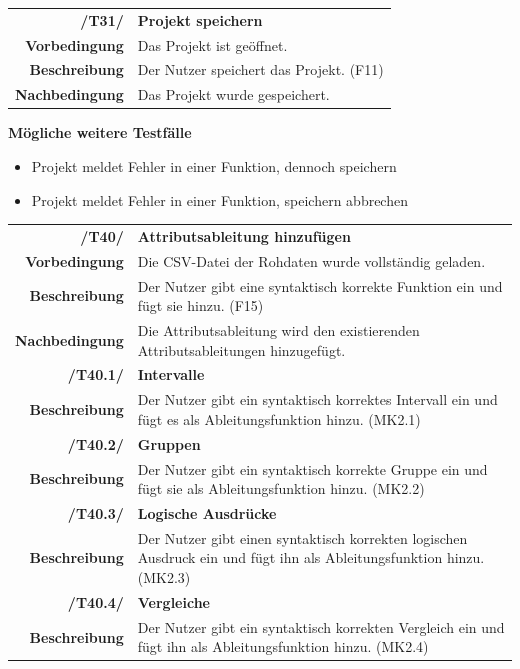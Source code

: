 \documentclass{article}
\begin{document}
\begin{table}[H]
\begin{tabularx}{\textwidth}{rX}
\textbf{/T31/}         & \textbf{Projekt speichern} \\
\textbf{Vorbedingung}  & Das Projekt ist geöffnet.   \\
\textbf{Beschreibung}  & Der Nutzer speichert das Projekt. (F11) \\
\textbf{Nachbedingung} & Das Projekt wurde gespeichert.
\end{tabularx}
\end{table}
\textbf{Mögliche weitere Testfälle}
\begin{itemize}
    \item Projekt meldet Fehler in einer Funktion, dennoch speichern
    \item Projekt meldet Fehler in einer Funktion, speichern abbrechen
\end{itemize}

\begin{table}[H]
\begin{tabularx}{\textwidth}{rX}
\textbf{/T40/}         & \textbf{Attributsableitung hinzufügen} \\
\textbf{Vorbedingung}  & Die CSV-Datei der Rohdaten wurde vollständig geladen.   \\
\textbf{Beschreibung}  & Der Nutzer gibt eine syntaktisch korrekte Funktion ein und fügt sie hinzu. (F15) \\
\textbf{Nachbedingung} & Die Attributsableitung wird den existierenden Attributsableitungen hinzugefügt.\\

\textbf{/T40.1/}         & \textbf{Intervalle} \\
\textbf{Beschreibung}  & Der Nutzer gibt ein syntaktisch korrektes Intervall ein und fügt es als Ableitungsfunktion hinzu. (MK2.1) \\

\textbf{/T40.2/}         & \textbf{Gruppen} \\
\textbf{Beschreibung}  & Der Nutzer gibt ein syntaktisch korrekte Gruppe ein und fügt sie als Ableitungsfunktion hinzu. (MK2.2) \\

\textbf{/T40.3/}         & \textbf{Logische Ausdrücke} \\
\textbf{Beschreibung}  & Der Nutzer gibt einen syntaktisch korrekten logischen Ausdruck ein und fügt ihn als Ableitungsfunktion hinzu. (MK2.3) \\

\textbf{/T40.4/}         & \textbf{Vergleiche} \\
\textbf{Beschreibung}  & Der Nutzer gibt ein syntaktisch korrekten Vergleich ein und fügt ihn als Ableitungsfunktion hinzu. (MK2.4) \\
\end{tabularx}
\end{table}
\end{document}
